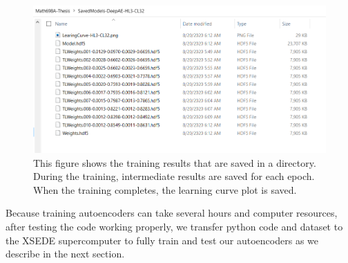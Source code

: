 \documentclass{article}
\begin{document}
\begin{figure}[h!]
	\includegraphics[width=1\linewidth]{training-results.png}
	\caption{This figure shows the training results that are saved in a directory. During the training, intermediate results are saved for each epoch. When the training completes, the learning curve plot is saved.}
	\label{fig:training-results}
\end{figure} 

Because training autoencoders can take several hours and computer resources, after testing the code working properly, we transfer python code and dataset to the XSEDE supercomputer to fully train and test our autoencoders as we describe in the next section.
\end{document}
